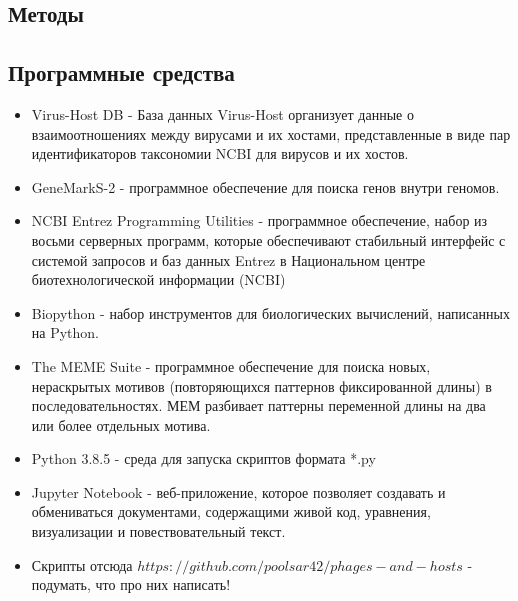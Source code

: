 \documentclass[14pt]{extarticle}
\begin{document}
    
\newpage
\begin{center}
\item \section{Методы} \label{sec:code}
\item \subsection{Программные средства}
\end{center}
\begin{itemize}
    \item Virus-Host DB - База данных Virus-Host организует данные о взаимоотношениях между вирусами и их хостами,
    представленные в виде пар идентификаторов таксономии NCBI для вирусов и их хостов. \cite{virus-host}
    
    \item GeneMarkS-2 - программное обеспечение для поиска генов внутри геномов. \cite{lomsad}
    
    \item NCBI Entrez Programming Utilities - программное обеспечение, набор из восьми серверных программ, которые
    обеспечивают стабильный интерфейс с системой запросов и баз данных Entrez в Национальном центре биотехнологической
    информации (NCBI) \cite{entrez}
    
    \item Biopython - набор инструментов для биологических вычислений, написанных на Python. \cite{biopython}
    
    \item The MEME Suite - программное обеспечение для поиска новых, нераскрытых мотивов (повторяющихся паттернов
    фиксированной длины) в последовательностях. МЕМ разбивает паттерны переменной длины на два или более отдельных
    мотива. \cite{bailey}
    
    \item Python 3.8.5 - среда для запуска скриптов формата *.py \cite{python}
    
    \item Jupyter Notebook - веб-приложение, которое позволяет создавать и обмениваться
    документами, содержащими живой код, уравнения, визуализации и повествовательный текст.\cite{jupyter}
    
    \item Скрипты отсюда \(https://github.com/poolsar42/phages-and-hosts\) - подумать, что про них написать!
    \cite{github}
    

\end{itemize}
\end{document}
